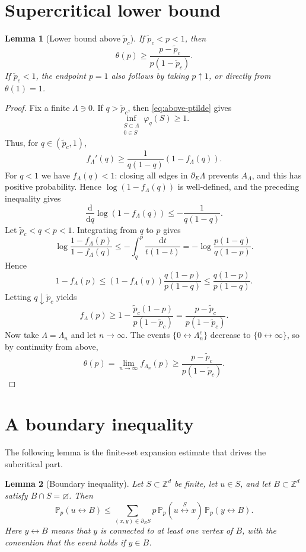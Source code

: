 \documentclass[11pt]{article}
\newtheorem{lemma}{Lemma}
\newcommand{\Z}{\mathbb Z}
\newcommand{\Pp}{\mathbb P_p}
\newcommand{\dd}{\mathrm d}
\newcommand{\conn}{\longleftrightarrow}
\newcommand{\pct}{\widetilde p_c}
\begin{document}
\section{Supercritical lower bound}

\begin{lemma}[Lower bound above $\pct$]
If $\pct<p<1$, then
\[
 \theta(p)\ge \frac{p-\pct}{p(1-\pct)}.
\]
If $\pct<1$, the endpoint $p=1$ also follows by taking $p\uparrow1$, or directly from $\theta(1)=1$.
\end{lemma}

\begin{proof}
Fix a finite $\Lambda\ni0$. If $q>\pct$, then \eqref{eq:above-ptilde} gives
\[
 \inf_{\substack{S\subset\Lambda\\0\in S}}\varphi_q(S)\ge1.
\]
Thus, for $q\in(\pct,1)$,
\[
 f_\Lambda'(q)
 \ge
 \frac1{q(1-q)}(1-f_\Lambda(q)).
\]
For $q<1$ we have $f_\Lambda(q)<1$: closing all edges in $\partial_E\Lambda$ prevents $A_\Lambda$, and this has positive probability. Hence $\log(1-f_\Lambda(q))$ is well-defined, and the preceding inequality gives
\[
 \frac{\dd}{\dd q}\log(1-f_\Lambda(q))
 \le
 -\frac1{q(1-q)}.
\]
Let $\pct<q<p<1$. Integrating from $q$ to $p$ gives
\[
 \log\frac{1-f_\Lambda(p)}{1-f_\Lambda(q)}
 \le
 -\int_q^p \frac{\dd t}{t(1-t)}
 =
 -\log\frac{p(1-q)}{q(1-p)}.
\]
Hence
\[
 1-f_\Lambda(p)
 \le
 (1-f_\Lambda(q))\frac{q(1-p)}{p(1-q)}
 \le
 \frac{q(1-p)}{p(1-q)}.
\]
Letting $q\downarrow\pct$ yields
\[
 f_\Lambda(p)
 \ge
 1-\frac{\pct(1-p)}{p(1-\pct)}
 =
 \frac{p-\pct}{p(1-\pct)}.
\]
Now take $\Lambda=\Lambda_n$ and let $n\to\infty$. The events $\{0\conn\Lambda_n^c\}$ decrease to $\{0\conn\infty\}$, so by continuity from above,
\[
 \theta(p)=\lim_{n\to\infty}f_{\Lambda_n}(p)
 \ge
 \frac{p-\pct}{p(1-\pct)}.
\]
\end{proof}

\section{A boundary inequality}

The following lemma is the finite-set expansion estimate that drives the subcritical part.

\begin{lemma}[Boundary inequality]
Let $S\subset\Z^d$ be finite, let $u\in S$, and let $B\subset\Z^d$ satisfy $B\cap S=\varnothing$. Then
\[
 \Pp(u\conn B)
 \le
 \sum_{(x,y)\in\partial_E S}
 p\,\Pp(u\stackrel{S}{\conn}x)\,\Pp(y\conn B).
\]
Here $y\conn B$ means that $y$ is connected to at least one vertex of $B$, with the convention that the event holds if $y\in B$.
\end{lemma}
\end{document}
